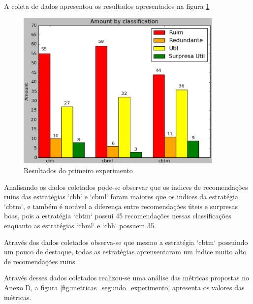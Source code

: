 A coleta de dados apresentou os resultados apresentados na figura
\ref{fig:primeiro_experimento}

\pagebreak

\begin{figure}[h]
  \centering
  \includegraphics[width=0.9\textwidth]{figuras/primeiro_experimento.eps}
  \caption{Resultados do primeiro experimento}
  \label{fig:primeiro_experimento}
\end{figure}

Analisando os dados coletados pode-se observar que os indices de recomendações
ruins das estratégias `cbh` e `cbml` foram maiores que os indices da estratégia
`cbtm`, e também é notável a diferença entre recomendações úteis e surpresas
boas, pois a estratégia `cbtm` possui 45 recomendações nessas classificações
enquanto as estratégias `cbml` e `cbh` possuem 35.

Através dos dados coletados observa-se que mesmo a estratégia `cbtm` possuindo
um pouco de destaque, todas as estratégias aprensentaram um índice muito alto
de recomendações ruins

Através desses dados coletados realizou-se uma análise das métricas propostas
no Anexo D, a figura \ref{fig:metricas_segundo_experimento} apresenta os valores
das métricas.

\pagebreak

